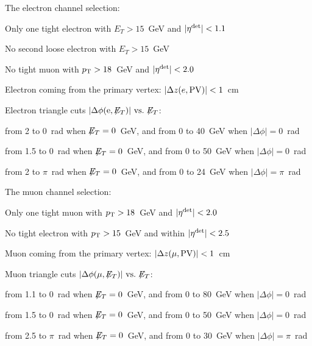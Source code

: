 \vspace{-0.07in}
The electron channel selection: 
\vspace{-0.07in}
\begin{myitemize}
\item Only one tight electron with $E_T > 15$~GeV and
$|\mbox{$\eta^{\rm det}$}| < 1.1$
\item No second loose electron with $E_T > 15$~GeV
\item No tight muon with ${\mbox{$p_{\rm T}$}} > 18$~GeV and $|\mbox{$\eta^{\rm det}$}| < 2.0$ 
\item Electron coming from the primary vertex:
$|\Delta z(e,{\rm PV})| < 1$~cm
\item Electron triangle cuts $|\Delta\phi({\rm e,{\mbox{$\not\!\!E_T$}}})|{\rm ~vs.~}
{\mbox{$\not\!\!E_T$}}$:
   \vspace{-0.07in} 
   \begin{myitemize}
   \item from 2 to 0~rad when ${\mbox{$\not\!\!E_T$}} = 0$~GeV, and {\met} from 0
   to 40~GeV when $|\Delta\phi| = 0$~rad
   \item from 1.5 to 0~rad when ${\mbox{$\not\!\!E_T$}} = 0$~GeV, and {\met} from 0
   to 50~GeV when $|\Delta\phi| = 0$~rad
   \item  from 2 to $\pi$~rad when ${\mbox{$\not\!\!E_T$}} = 0$~GeV, and {\met}
   from 0 to 24~GeV when $|\Delta\phi| = \pi$~rad
   \end{myitemize}
\end{myitemize}

\vspace{-0.07in}
The muon channel selection: 
\vspace{-0.07in}
\begin{myitemize}
\item Only one tight muon with ${\mbox{$p_{\rm T}$}} > 18$~GeV and $|\mbox{$\eta^{\rm det}$}| < 2.0$ 
\item No tight electron with ${\mbox{$p_{\rm T}$}} > 15$~GeV and within $|\mbox{$\eta^{\rm det}$}|
< 2.5$
\item Muon coming from the primary vertex: $|\Delta z(\mu,{\rm PV})|
< 1$~cm
\item Muon triangle cuts $|\Delta\phi(\mu,{\rm {\mbox{$\not\!\!E_T$}}})|{\rm ~vs.~}
{\mbox{$\not\!\!E_T$}}$: 
   \vspace{-0.07in}
   \begin{myitemize}
   \item  from 1.1 to 0~rad when ${\mbox{$\not\!\!E_T$}} = 0$~GeV, and {\met}
   from 0 to 80~GeV when $|\Delta\phi| = 0$~rad
   \item  from 1.5 to 0~rad when ${\mbox{$\not\!\!E_T$}} = 0$~GeV, and {\met}
   from 0 to 50~GeV when $|\Delta\phi| = 0$~rad
   \item from 2.5 to $\pi$~rad when ${\mbox{$\not\!\!E_T$}} = 0$~GeV, and {\met}
   from 0 to 30~GeV when $|\Delta\phi| = \pi$~rad
   \end{myitemize}
\end{myitemize}

